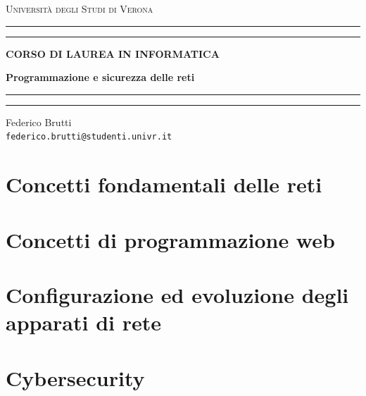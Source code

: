 \documentclass[12pt,a4paper,oneside]{book}
\begin{document}
	
	\begin{titlepage}
		\begin{center}
			{{\LARGE{\textsc{Università degli Studi di Verona}}}} \rule[0.1cm]{15.8cm}{0.1mm}
			\rule[0.5cm]{15.8cm}{0.6mm}
			{\small{\bf CORSO DI LAUREA IN INFORMATICA}}
		\end{center}
		\vspace{12.5mm}
		
		\begin{center}
			{\Huge{\bf Programmazione e sicurezza delle reti}}
		\end{center}
		\vspace{130mm}
		
		\begin{minipage}[l]{1.8mm}
			\rule[0.1cm]{0.1mm}{2cm}
			\rule[0.1cm]{0.6mm}{2cm}
		\end{minipage}
		\hspace{2mm}
		\begin{minipage}{10cm}	
			{\large{Federico Brutti\\
			\texttt{federico.brutti@studenti.univr.it}}}
		\end{minipage}
	\end{titlepage}
	
	\blankpage
	\tableofcontents
	
	\chapter{Concetti fondamentali delle reti}
	
	\chapter{Concetti di programmazione web}
	
	\chapter{Configurazione ed evoluzione degli apparati di rete}
	
	\chapter{Cybersecurity}
	
\end{document}
